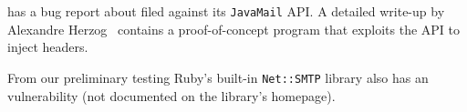  has a bug report about \ehi filed against its \texttt{JavaMail} API. A detailed write-up by Alexandre Herzog~\cite{Herzog.2014} contains a proof-of-concept program that exploits the API to inject headers.

\begin{sloppypar}
From our preliminary testing Ruby's built-in \texttt{Net::SMTP} library also has an \ehi vulnerability (not documented on the library's homepage).
\end{sloppypar}
%


